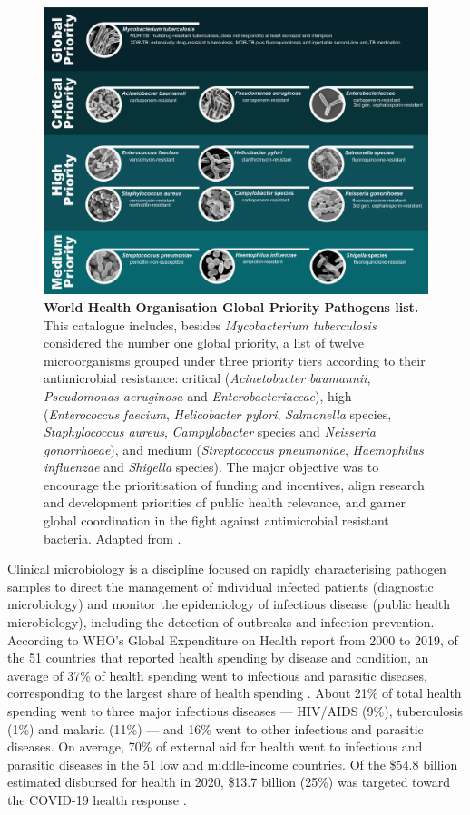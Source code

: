 \begin{figure}[h!]
\centering
\includegraphics[width=\textwidth]{figures/introduction/Figure 1.png}
\caption{\textbf{World Health Organisation Global Priority Pathogens list.} This catalogue includes, besides \textit{Mycobacterium tuberculosis} considered the number one global priority, a list of twelve microorganisms grouped under three priority tiers according to their antimicrobial resistance: critical (\textit{Acinetobacter baumannii}, \textit{Pseudomonas aeruginosa} and \textit{Enterobacteriaceae}), high (\textit{Enterococcus faecium}, \textit{Helicobacter pylori}, \textit{Salmonella} species, \textit{Staphylococcus aureus}, \textit{Campylobacter} species and \textit{Neisseria gonorrhoeae}), and medium (\textit{Streptococcus pneumoniae}, \textit{Haemophilus influenzae} and \textit{Shigella} species). The major objective was to encourage the prioritisation of funding and incentives, align research and development priorities of public health relevance, and garner global coordination in the fight against antimicrobial resistant bacteria. Adapted from \cite{world_health_organization_prioritization_2017}.}
\label{fig:figure1}
\end{figure}

Clinical microbiology is a discipline focused on rapidly characterising pathogen samples to direct the management of individual infected patients (diagnostic microbiology) and monitor the epidemiology of infectious disease (public health microbiology), including the detection of outbreaks and infection prevention. According to WHO's Global Expenditure on Health report from 2000 to 2019, of the 51 countries that reported health spending by disease and condition, an average of 37\% of health spending went to infectious and parasitic diseases, corresponding to the largest share of health spending \citep{world_health_organization_global_2021}. About 21\% of total health spending went to three major infectious diseases — HIV/AIDS (9\%), tuberculosis (1\%) and malaria (11\%) — and 16\% went to other infectious and parasitic diseases. On average, 70\% of external aid for health went to infectious and parasitic diseases in the 51 low and middle-income countries. Of the \$54.8 billion estimated disbursed for health in 2020, \$13.7 billion (25\%) was targeted toward the COVID-19 health response \citep{micah_tracking_2021}.

